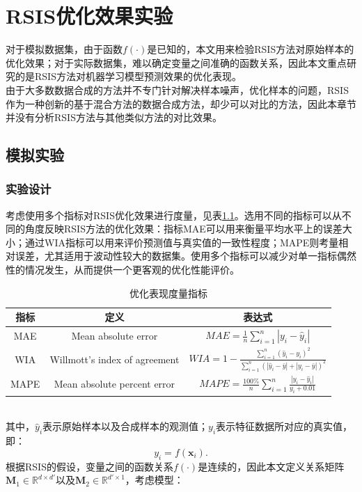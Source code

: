 \documentclass{NauThesis}
\begin{document}
\chapter{RSIS优化效果实验}
对于模拟数据集，由于函数$f(\cdot)$是已知的，本文用来检验RSIS方法对原始样本的优化效果；对于实际数据集，难以确定变量之间准确的函数关系，因此本文重点研究的是RSIS方法对机器学习模型预测效果的优化表现。
\\\hspace*{2em}由于大多数数据合成的方法并不专门针对解决样本噪声，优化样本的问题，RSIS作为一种创新的基于混合方法的数据合成方法，却少可以对比的方法，因此本章节并没有分析RSIS方法与其他类似方法的对比效果。
\section{模拟实验}
\subsection{实验设计}
考虑使用多个指标对RSIS优化效果进行度量，见表\ref{tab1}。选用不同的指标可以从不同的角度反映RSIS方法的优化效果：指标MAE可以用来衡量平均水平上的误差大小；通过WIA指标可以用来评价预测值与真实值的一致性程度；MAPE则考量相对误差，尤其适用于波动性较大的数据集。使用多个指标可以减少对单一指标偶然性的情况发生，从而提供一个更客观的优化性能评价。
\begin{table}[ht]
    \centering
    \caption{优化表现度量指标}
    \begin{tabular}{ccc}
    \hline
    指标 & 定义 & 表达式 \\ \hline
    MAE & Mean absolute error & \( MAE = \frac{1}{n} \sum\limits_{i=1}^{n} |y_i - \hat{y}_i| \) \\
    WIA & Willmott's index of agreement & \( WIA = 1 - \frac{\sum\limits_{i=1}^{n} (\hat{y}_i - y_i)^2}{\sum\limits_{i=1}^{n} (|\hat{y}_i - \bar{y}| + |y_i - \bar{y}|)^2} \) \\
    MAPE & Mean absolute percent error & \( MAPE = \frac{100\%}{n} \sum\limits_{i=1}^{n} \frac{|y_i - \hat{y}_i|}{y_i + 0.01} \) \\ \hline
    \end{tabular}
    \label{tab1}
\end{table}
\\其中，$\hat{y}_i$表示原始样本以及合成样本的观测值；$y_i$表示特征数据所对应的真实值，即：
$$y_i=f(\boldsymbol{x}_i).$$
\hspace*{2em}根据RSIS的假设，变量之间的函数关系$f(\cdot)$是连续的，因此本文定义关系矩阵$\boldsymbol{M}_1\in\mathbb{R}^{d\times{d'}}$以及$\boldsymbol{M}_2\in\mathbb{R}^{d'\times{1}}$，考虑模型：
\end{document}
